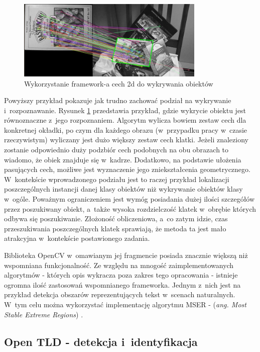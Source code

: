\begin{figure}[h!]
  \centering
    \includegraphics[width=0.8\textwidth]{img/rev_features2d_detection}
  \caption{Wykorzystanie framework-a cech 2d do wykrywania obiektów}
  \label{fig:rev_features2d_detection}
\end{figure}

Powyższy przykład pokazuje jak trudno zachować podział na wykrywanie
i~rozpoznawanie. Rysunek \ref{fig:rev_features2d_detection}
przedstawia przykład, gdzie wykrycie obiektu jest równoznaczne
z~jego rozpoznaniem.
Algorytm wylicza bowiem zestaw cech dla konkretnej okładki, po czym dla każdego
obrazu (w~przypadku pracy w~czasie rzeczywistym) wyliczany
jest dużo większy zestaw cech klatki. Jeżeli znaleziony zostanie
odpowiednio duży podzbiór cech podobnych na obu obrazach to wiadomo,
że obiek znajduje się w~kadrze.
Dodatkowo, na podstawie ułożenia pasujących cech, możliwe jest
wyznaczenie jego zniekształcenia geometrycznego. W~kontekście wprowadzonego
podziału jest to raczej przykład lokalizacji poszczególnych instancji danej
klasy obiektów niż wykrywanie obiektów klasy w~ogóle.
Poważnym
ograniczeniem jest wymóg posiadania dużej ilości szczegółów przez poszukiwany
obiekt, a~także wysoka rozdzielczość klatek w~obrębie których odbywa się
poszukiwanie. Złożoność obliczeniowa, a~co zatym idzie, czas przeszukiwania
poszczególnych klatek sprawiają, że metoda ta jest mało atrakcyjna w~kontekście
postawionego zadania.

Biblioteka OpenCV w~omawianym jej fragmencie posiada znacznie
większą niż wspomniana funkcjonalność.
Ze względu na mnogość zaimplementowanych algorytmów - których opis
wykracza poza zakres tego opracowania - istnieje ogromna ilość
zastosowań wspomnianego frameworka. Jednym z~nich jest na przykład
detekcja obszarów
reprezentujących tekst w~scenach naturalnych. W~tym celu
można wykorzystać implementację algorytmu MSER - (\textit{ang. Most
Stable Extreme Regions}) \cite{OCV:MSER}.

\subsection{Open TLD - detekcja i~identyfikacja}


